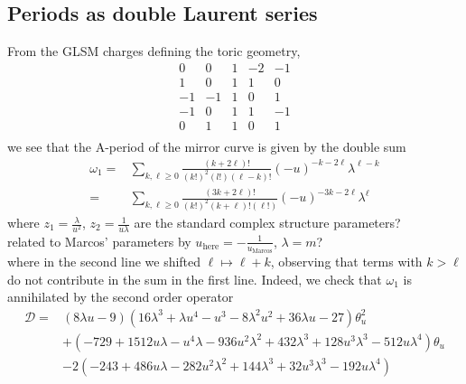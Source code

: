 \documentclass[11pt, a4paper]{article}
\def\rishi#1{{\color{magenta} #1}}
\numberwithin{equation}{section}
\begin{document}
\subsection{Periods as double Laurent series}
From the GLSM charges defining the toric geometry, 
\begin{equation}
    \begin{array}{ccc|cc} 
    0 & 0 & 1 & -2 & -1 \\
    1 & 0 & 1 & 1 & 0 \\
    -1 & -1 & 1 & 0 &1 \\
   -1 & 0 & 1 & 1 & -1 \\
   0  & 1 & 1 & 0 & 1 \\
   \end{array}
\end{equation}
we see that the A-period of the mirror curve is given by the double sum
\begin{equation}
  \begin{aligned}
  \omega_1 =& 
  \sum_{k,\ell\geq 0} \frac{(k+2\ell)!}{(k!)^2 (l!) (\ell-k)!} 
  (-u)^{-k-2\ell} \lambda^{\ell-k}  \\
  = &
  \sum_{k,\ell\geq 0} \frac{(3k+2\ell)!}{(k!)^2 (k+\ell)! (\ell!)} 
  (-u)^{-3k-2\ell} \lambda^{\ell} 
  \end{aligned}
\end{equation}
\rishi{where $z_1 = \frac{\lambda}{u^2}$, $z_2 = \frac{1}{u \lambda}$ are the standard complex structure parameters? \\
related to Marcos' parameters by $u_\text{here} = -\frac{1}{u_\text{Marcos}}$, $\lambda = m$?} \\
where in the second line we shifted $\ell\mapsto \ell+k$, observing that terms with $k>\ell$ do not contribute in the sum in the first line. Indeed, we check that $\omega_1$ is annihilated by the second order operator
\begin{equation}
\begin{aligned}
        \mathcal{D}
    =& (8 \lambda  u-9) \left(16 \lambda ^3+\lambda  u^4-u^3-8 \lambda ^2 u^2+36 \lambda  u-27\right) \theta_u^2 \\ &
     +(-729 + 1512 u \lambda - 
     u^4 \lambda - 936 u^2 \lambda^2 + 432 \lambda^3 + 
     128 u^3 \lambda^3 - 512 u \lambda^4) \theta_u 
      \\ &   
     -2 (-243 + 486 u \lambda - 282 u^2 \lambda^2 + 
     144 \lambda^3 + 32 u^3 \lambda^3 - 
     192 u \lambda^4) 
     \end{aligned}
\end{equation}\
\end{document}
